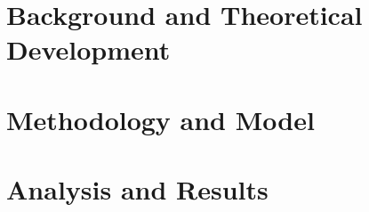 

\part{Background and Theoretical Development} \label{part-background}






\part{Methodology and Model} \label{part-model}



\part{Analysis and Results} \label{part-analysis}

 

% 
% 
